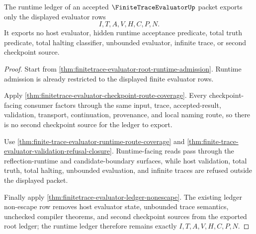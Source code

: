 \begin{theorem}
\label{thm:finitetrace-evaluator-runtime-ledger-nonescape}
The runtime ledger of an accepted $\FiniteTraceEvaluatorUp$ packet exports only the displayed evaluator rows
$$
I,T,A,V,H,C,P,N.
$$
It exports no host evaluator, hidden runtime acceptance predicate, total truth predicate, total halting classifier, unbounded evaluator, infinite trace, or second checkpoint source.
\end{theorem}
\begin{proof}
Start from \autoref{thm:finitetrace-evaluator-root-runtime-admission}. Runtime admission is already restricted to the displayed finite evaluator rows.

Apply \autoref{thm:finitetrace-evaluator-checkpoint-route-coverage}. Every checkpoint-facing consumer factors through the same input, trace, accepted-result, validation, transport, continuation, provenance, and local naming route, so there is no second checkpoint source for the ledger to export.

Use \autoref{thm:finite-trace-evaluator-runtime-route-coverage} and \autoref{thm:finite-trace-evaluator-validation-refusal-closure}. Runtime-facing reads pass through the reflection-runtime and candidate-boundary surfaces, while host validation, total truth, total halting, unbounded evaluation, and infinite traces are refused outside the displayed packet.

Finally apply \autoref{thm:finitetrace-evaluator-ledger-nonescape}. The existing ledger non-escape row removes host evaluator state, unbounded trace semantics, unchecked compiler theorems, and second checkpoint sources from the exported root ledger; the runtime ledger therefore remains exactly $I,T,A,V,H,C,P,N$.
\end{proof}
